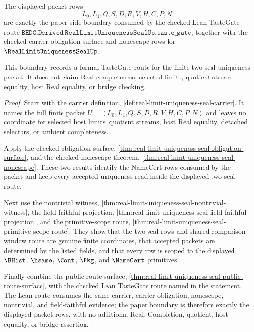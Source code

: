 \begin{theorem}
\label{thm:real-limit-uniqueness-seal-formal-tastegate-boundary}
The displayed packet rows
$$
L_0,L_1,Q,S,D,R,V,H,C,P,N
$$
are exactly the paper-side boundary consumed by the checked Lean TasteGate route $\texttt{BEDC.Derived.RealLimitUniquenessSealUp.taste\_gate}$, together with the checked carrier-obligation surface and nonescape rows for $\RealLimitUniquenessSealUp$.

This boundary records a formal TasteGate route for the finite two-seal uniqueness packet. It does not claim Real completeness, selected limits, quotient stream equality, host Real equality, or bridge checking.
\end{theorem}
\begin{proof}
Start with the carrier definition, \autoref{def:real-limit-uniqueness-seal-carrier}. It names the full finite packet $U=(L_0,L_1,Q,S,D,R,V,H,C,P,N)$ and leaves no coordinate for selected host limits, quotient streams, host Real equality, detached selectors, or ambient completeness.

Apply the checked obligation surface, \autoref{thm:real-limit-uniqueness-seal-obligation-surface}, and the checked nonescape theorem, \autoref{thm:real-limit-uniqueness-seal-nonescape}. These two results identify the NameCert rows consumed by the packet and keep every accepted uniqueness read inside the displayed two-seal route.

Next use the nontrivial witness, \autoref{thm:real-limit-uniqueness-seal-nontrivial-witness}, the field-faithful projection, \autoref{thm:real-limit-uniqueness-seal-field-faithful-projection}, and the primitive-scope route, \autoref{thm:real-limit-uniqueness-seal-primitive-scope-route}. They show that the two seal rows and shared comparison-window route are genuine finite coordinates, that accepted packets are determined by the listed fields, and that every row is scoped to the displayed $\BHist$, $\hsame$, $\Cont$, $\Pkg$, and $\NameCert$ primitives.

Finally combine the public-route surface, \autoref{thm:real-limit-uniqueness-seal-public-route-surface}, with the checked Lean TasteGate route named in the statement. The Lean route consumes the same carrier, carrier-obligation, nonescape, nontrivial, and field-faithful evidence; the paper boundary is therefore exactly the displayed packet rows, with no additional Real, Completion, quotient, host-equality, or bridge assertion.
\end{proof}

